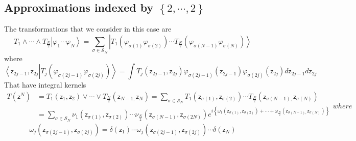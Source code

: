 \documentclass[aps,preprint]{revtex4}%
\begin{document}
\subsection{Approximations indexed by $\left\{  2,\cdots,2\right\}  $}

The transformations that we consider in this case are
\begin{equation}
T_{1}\wedge\cdots\wedge T_{\frac{N}{2}}\left\vert \varphi_{1}\cdots\varphi
_{N}\right\rangle =%
{\displaystyle\sum\limits_{\sigma\in\mathcal{S}_{N}}}
\left\vert T_{1}\left(  \varphi_{\sigma\left(  1\right)  }\varphi
_{\sigma\left(  2\right)  }\right)  \cdots T_{\frac{N}{2}}\left(
\varphi_{\sigma\left(  N-1\right)  }\varphi_{\sigma\left(  N\right)  }\right)
\right\rangle
\end{equation}
where
\begin{equation}
\left\langle \mathsf{z}_{2j-1},\mathsf{z}_{2j}\right.  \left\vert T_{j}\left(
\varphi_{\sigma\left(  2j-1\right)  }\varphi_{\sigma\left(  2j\right)
}\right)  \right\rangle =\int T_{j}\left(  \mathsf{z}_{2j-1},\mathsf{z}%
_{2j}\right)  \varphi_{\sigma\left(  2j-1\right)  }\left(  \mathsf{z}%
_{2j-1}\right)  \varphi_{\sigma\left(  2j\right)  }\left(  \mathsf{z}%
_{2j}\right)  d\mathsf{z}_{2j-1}d\mathsf{z}_{2j}%
\end{equation}
That have integral kernels
\begin{subequations}
\begin{align}
T\left(  \mathsf{z}^{N}\right)   &  =T_{1}\left(  \mathsf{z}_{1}%
,\mathsf{z}_{2}\right)  \vee\cdots\vee T_{\frac{N}{2}}\left(  \mathsf{z}%
_{N-1,}\mathsf{z}_{N}\right)  =%
{\textstyle\sum\limits_{\sigma\in\mathcal{S}_{N}}}
T_{1}\left(  \mathsf{z}_{\sigma\left(  1\right)  },\mathsf{z}_{\sigma\left(
2\right)  }\right)  \cdots T_{\frac{N}{2}}\left(  \mathsf{z}_{\sigma\left(
N-1\right)  ,}\mathsf{z}_{\sigma\left(  N\right)  }\right) \nonumber\\
&  =\sum_{\sigma\in\mathcal{S}_{N}}\nu_{1}\left(  \mathsf{z}_{\sigma\left(
1\right)  },\mathsf{z}_{\sigma\left(  2\right)  }\right)  \cdots\nu_{\frac
{N}{2}}\left(  \mathsf{z}_{\sigma\left(  N-1\right)  },\mathsf{z}%
_{\sigma\left(  2N\right)  }\right)  e^{i\left\{  \omega_{1}\left(
\mathsf{z}_{\sigma\left(  1\right)  },\mathsf{z}_{\sigma\left(  2\right)
}\right)  +\cdots+\omega_{\frac{N}{2}}\left(  \mathsf{z}_{\sigma\left(
N-1\right)  ,}\mathsf{z}_{\sigma\left(  N\right)  }\right)  \right\}  }%
\end{align}
where
\end{subequations}
\begin{equation}
\omega_{j}\left(  \mathsf{z}_{\sigma\left(  2j-1\right)  },\mathsf{z}%
_{\sigma\left(  2j\right)  }\right)  =\delta\left(  \mathsf{z}_{1}\right)
\cdots\omega_{j}\left(  \mathsf{z}_{\sigma\left(  2j-1\right)  }%
,\mathsf{z}_{\sigma\left(  2j\right)  }\right)  \cdots\delta\left(
\mathsf{z}_{N}\right)
\end{equation}
\end{document}
